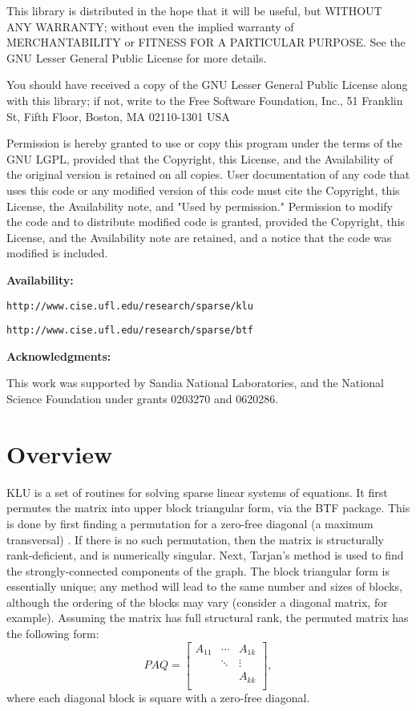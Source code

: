 \documentclass[11pt]{article}
\begin{document}
    This library is distributed in the hope that it will be useful,
    but WITHOUT ANY WARRANTY; without even the implied warranty of
    MERCHANTABILITY or FITNESS FOR A PARTICULAR PURPOSE.  See the GNU
    Lesser General Public License for more details.

    You should have received a copy of the GNU Lesser General Public
    License along with this library; if not, write to the Free Software
    Foundation, Inc., 51 Franklin St, Fifth Floor, Boston, MA  02110-1301
    USA

    Permission is hereby granted to use or copy this program under the
    terms of the GNU LGPL, provided that the Copyright, this License,
    and the Availability of the original version is retained on all copies.
    User documentation of any code that uses this code or any modified
    version of this code must cite the Copyright, this License, the
    Availability note, and "Used by permission." Permission to modify
    the code and to distribute modified code is granted, provided the
    Copyright, this License, and the Availability note are retained,
    and a notice that the code was modified is included.

{\bf Availability:}

    {\tt http://www.cise.ufl.edu/research/sparse/klu}

    {\tt http://www.cise.ufl.edu/research/sparse/btf}

{\bf Acknowledgments:}

    This work was supported by Sandia National Laboratories,
    and the National Science Foundation under grants 0203270 and 0620286.

\newpage
\section{Overview}

KLU is a set of routines for solving sparse linear systems of equations.  It
first permutes the matrix into upper block triangular form, via the BTF
package.  This is done by first finding a permutation for a zero-free diagonal
(a maximum transversal) \cite{Duff81}. If there is no such permutation, then
the matrix is structurally rank-deficient, and is numerically singular.  Next,
Tarjan's method \cite{Duff78a,Tarjan72} is used to find the strongly-connected
components of the graph.  The block triangular form is essentially unique; any
method will lead to the same number and sizes of blocks, although the ordering
of the blocks may vary (consider a diagonal matrix, for example).  Assuming the
matrix has full structural rank, the permuted matrix has the following form:
\[
PAQ =
\left[
\begin{array}{ccc}
A_{11} & \cdots & A_{1k} \\
       & \ddots & \vdots \\
       &        & A_{kk} \\
\end{array}
\right],
\]
where each diagonal block is square with a zero-free diagonal.
\end{document}
